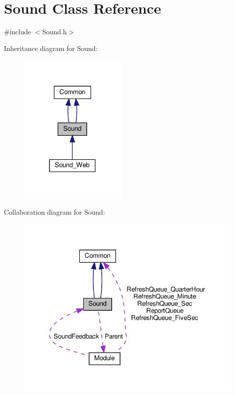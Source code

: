 \hypertarget{class_sound}{}\section{Sound Class Reference}
\label{class_sound}


{\ttfamily \#include $<$Sound.\+h$>$}



Inheritance diagram for Sound\+:
\nopagebreak
\begin{figure}[H]
\begin{center}
\leavevmode
\includegraphics[width=150pt]{class_sound__inherit__graph}
\end{center}
\end{figure}


Collaboration diagram for Sound\+:
\nopagebreak
\begin{figure}[H]
\begin{center}
\leavevmode
\includegraphics[width=322pt]{class_sound__coll__graph}
\end{center}
\end{figure}
